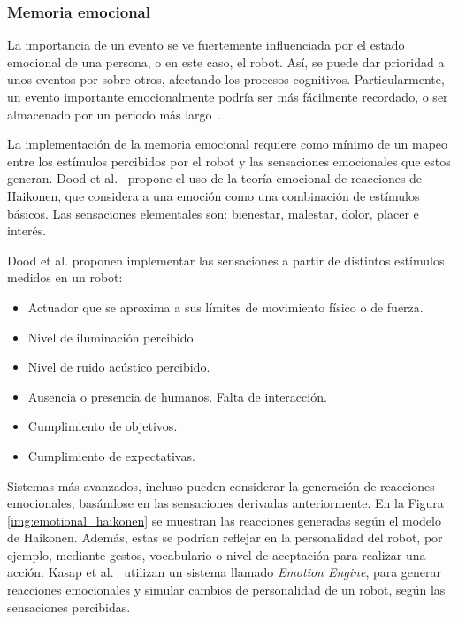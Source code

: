 \subsubsection{Memoria emocional}

La importancia de un evento se ve fuertemente influenciada por el estado emocional de una persona, o en este caso, el robot. Así, se puede dar prioridad a unos eventos por sobre otros, afectando los procesos cognitivos. Particularmente, un evento importante emocionalmente podría ser más fácilmente recordado, o ser almacenado por un periodo más largo~\cite{Deutsch2008}.

La implementación de la memoria emocional requiere como mínimo de un mapeo entre los estímulos percibidos por el robot y las sensaciones emocionales que estos generan. Dood et al.~\cite{Dodd2005} propone el uso de la teoría emocional de reacciones de Haikonen, que considera a una emoción como una combinación de estímulos básicos. Las sensaciones elementales son: bienestar, malestar, dolor, placer e interés.

Dood et al. proponen implementar las sensaciones a partir de distintos estímulos medidos en un robot:
\begin{itemize}
	\item Actuador que se aproxima a sus límites de movimiento físico o de fuerza. 
	\item Nivel de iluminación percibido.
	\item Nivel de ruido acústico percibido.
	\item Ausencia o presencia de humanos. Falta de interacción.
	\item Cumplimiento de objetivos.
	\item Cumplimiento de expectativas.
\end{itemize}

Sistemas más avanzados, incluso pueden considerar la generación de reacciones emocionales, basándose en las sensaciones derivadas anteriormente. En la Figura \ref{img:emotional_haikonen} se muestran las reacciones generadas según el modelo de Haikonen. Además, estas se podrían reflejar en la personalidad del robot, por ejemplo, mediante gestos, vocabulario o nivel de aceptación para realizar una acción. Kasap et al.~\cite{Kasap2010} utilizan un sistema llamado \textit{Emotion Engine}, para generar reacciones emocionales y simular cambios de personalidad de un robot, según las sensaciones percibidas.

